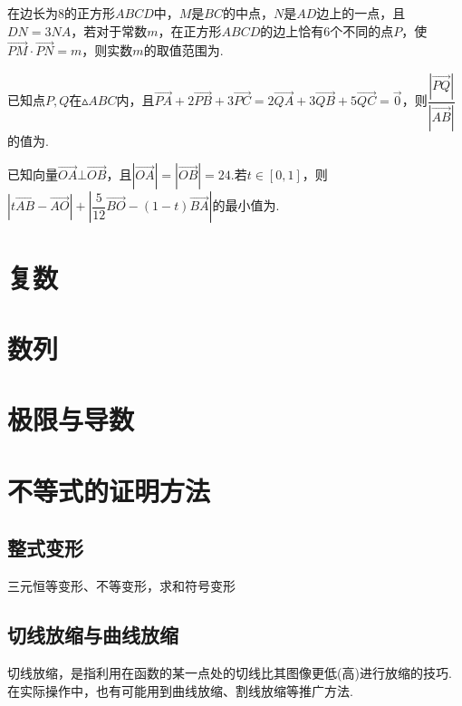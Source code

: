 \documentclass[cn,hazy,black,10pt,normal]{elegantnote}
\newcommand{\tk}{\uline{\hspace{4em}}}
\newcommand{\xl}[1]{\overrightarrow{#1}}
\begin{document}
\begin{problem} %
	在边长为$8$的正方形$ABCD$中，$M$是$BC$的中点，$N$是$AD$边上的一点，且$DN=3NA$，若对于常数$m$，在正方形$ABCD$的边上恰有$6$个不同的点$P$，使$\xl{PM} \cdot \xl{PN} = m$，则实数$m$的取值范围为\tk .
\end{problem}

\begin{problem} %
	已知点$P,Q$在$\vartriangle ABC$内，且$\xl{PA}+2\xl{PB}+3\xl{PC}=2\xl{QA}+3\xl{QB}+5\xl{QC}=\xl{0}$，则$\dfrac{|\xl{PQ}|}{|\xl{AB}|}$的值为\tk .
\end{problem}

\begin{problem} %
	已知向量$\xl{OA} \bot \xl{OB}$，且$|\xl{OA}|=|\xl{OB}|=24$.若$t \in [0,1]$，则$|t\xl{AB}-\xl{AO}| + |\dfrac{5}{12} \xl{BO} - (1-t)\xl{BA}|$的最小值为\tk .
\end{problem}



\chapter{复数}

\chapter{数列}

\chapter{极限与导数}

\chapter{不等式的证明方法}

\section{整式变形}

三元恒等变形、不等变形，求和符号变形

\section{切线放缩与曲线放缩}

切线放缩，是指利用在函数的某一点处的切线比其图像更低(高)进行放缩的技巧.在实际操作中，也有可能用到曲线放缩、割线放缩等推广方法.
\end{document}
